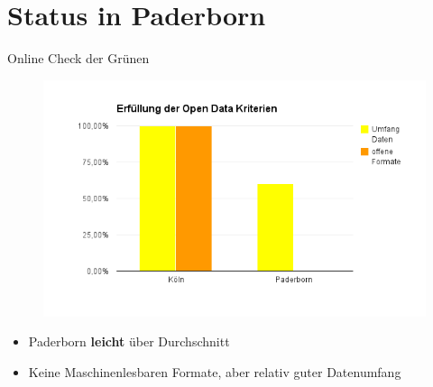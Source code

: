 \section{Status in Paderborn}

\begin{frame}[t]{Online Check der Grünen}
 \begin{figure}
  \centering
  \includegraphics[scale=0.5]{section_paderborn_status.png}
 \end{figure}
 \begin{itemize}
  \item Paderborn \textbf{leicht} über Durchschnitt
  \item Keine Maschinenlesbaren Formate, aber relativ guter Datenumfang
 \end{itemize}
\end{frame}
